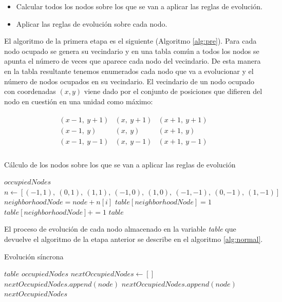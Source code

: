 \documentclass[../proyecto.tex]{memoir}
\begin{document}
\begin{itemize}
\item Calcular todos los nodos sobre los que se van a aplicar las reglas de evolución.
\item Aplicar las reglas de evolución sobre cada nodo.
\end{itemize}

El algoritmo de la primera etapa es el siguiente (Algoritmo \ref{alg:pre}). Para cada nodo ocupado se genera su vecindario y en una tabla común a todos los nodos se apunta el número de veces que aparece cada nodo del vecindario. De esta manera en la tabla resultante tenemos enumerados cada nodo que va a evolucionar y el número de nodos ocupados en su vecindario. El vecindario de un nodo ocupado con coordenadas $(x,y)$ viene dado por el conjunto de posiciones que difieren del nodo en cuestión en una unidad como máximo:

\begin{align*}
\begin{array}{lcr}
(x-1,\ y+1) & (x,\ y+1) & (x+1,\ y+1)\\
(x-1,\ y) & (x,\ y) & (x+1,\ y)\\
(x-1,\ y-1) & (x,\ y-1) & (x+1,\ y-1)\\
\end{array} 
\end{align*}


\begin{algorithm}[H]
\caption{Cálculo de los nodos sobre los que se van a aplicar las reglas de evolución}
\label{alg:pre}
\begin{algorithmic}
\REQUIRE $occupiedNodes$ 
\STATE $n \leftarrow [(-1, 1),\ (0, 1),\ (1, 1),\ (-1, 0),\ (1, 0),\ (-1,-1),\ (0,-1),\ (1,-1)]$
\STATE $neighborhoodNode = node + n[i]$
\STATE $table[neighborhoodNode] = 1$
\ELSE
\STATE $table[neighborhoodNode] += 1$
\ENDIF
\ENDFOR
\ENDFOR
\RETURN $table$
\end{algorithmic}
\end{algorithm}

El proceso de evolución de cada nodo almacenado en la variable \textit{table} que devuelve el algoritmo de la etapa anterior se describe en el algoritmo \ref{alg:normal}.

\begin{algorithm}[H]
\caption{Evolución síncrona}
\label{alg:normal}
\begin{algorithmic}
\REQUIRE $table$
\REQUIRE $occupiedNodes$
\STATE $nextOccupiedNodes \leftarrow []$
\STATE $nextOccupiedNodes.append(node)$
\STATE $nextOccupiedNodes.append(node)$
\ENDIF
\ENDFOR
\RETURN $nextOccupiedNodes$
\end{algorithmic}
\end{algorithm}
\end{document}
